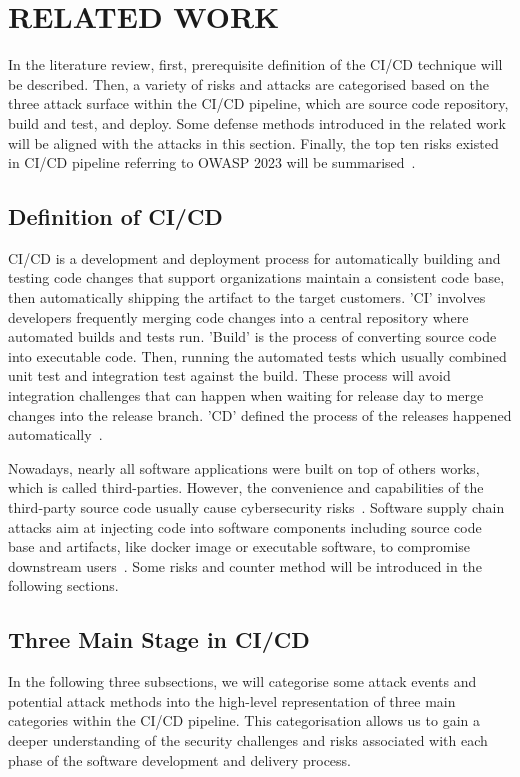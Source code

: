 \section{RELATED WORK}
In the literature review, first, prerequisite definition of the CI/CD technique will be 
described. Then, a variety of risks and attacks are categorised based on the three attack 
surface within the CI/CD pipeline, which are source code repository, build and test, and deploy.
Some defense methods introduced in the related work will be aligned with the attacks in this 
section. Finally, the top ten risks existed in CI/CD pipeline referring to OWASP 2023 will be 
summarised~\cite{OWASP2023}.

\subsection{Definition of CI/CD}
CI/CD is a development and deployment process for automatically building and testing code
changes that support organizations maintain a consistent code base, then automatically shipping 
the artifact to the target customers. 'CI' involves developers frequently merging code changes 
into a central repository where automated builds and tests run. 'Build' is the process of 
converting source code into executable code. Then, running the automated tests which usually 
combined unit test and integration test against the build. These process will avoid integration 
challenges that can happen when waiting for release day to merge changes into the release branch. 
'CD' defined the process of the releases happened automatically~\cite{DoDDefCI/CD2023}. 

Nowadays, nearly all software applications were built on top of others works, which is called third-parties.
However, the convenience and capabilities of the third-party source code usually cause cybersecurity 
risks~\cite{mastrangelo2015use}. Software supply chain attacks aim at injecting code into software
components including source code base and artifacts, like docker image or executable software,
to compromise downstream users~\cite{ladisa2023sok}. 
Some risks and counter method will be introduced in the following sections.

\subsection{Three Main Stage in CI/CD}
In the following three subsections, 
we will categorise some attack events and potential attack methods into the high-level representation 
of three main categories within the CI/CD pipeline. This categorisation allows us to gain a deeper understanding of 
the security challenges and risks associated with each phase of the software development and delivery process.

